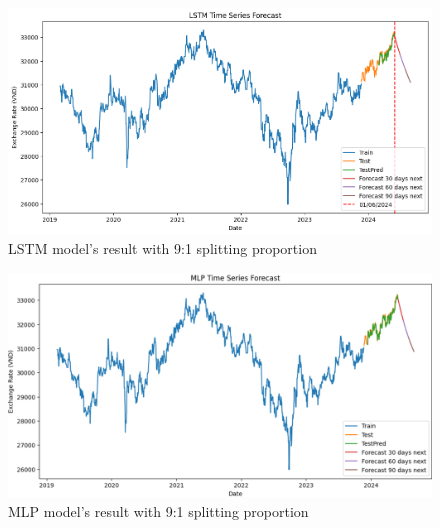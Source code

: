 \documentclass{ieeeojies}
\begin{document}
\begin{figure}[H]
  \centering
  \begin{minipage}{0.8\linewidth}
    \centering
    \includegraphics[width=\linewidth]{LSTM/lstm_gbp91.png}
    \caption{LSTM model's result with 9:1 splitting proportion}
    \label{fig24}
  \end{minipage}
\end{figure}
\begin{figure}[H]
  \centering
  \begin{minipage}{0.8\linewidth}
    \centering
    \includegraphics[width=\linewidth]{MLP/mlp_gbp_91.png}
    \caption{MLP model's result with 9:1 splitting proportion}
    \label{fig25}
  \end{minipage}
\end{figure}
\end{document}
